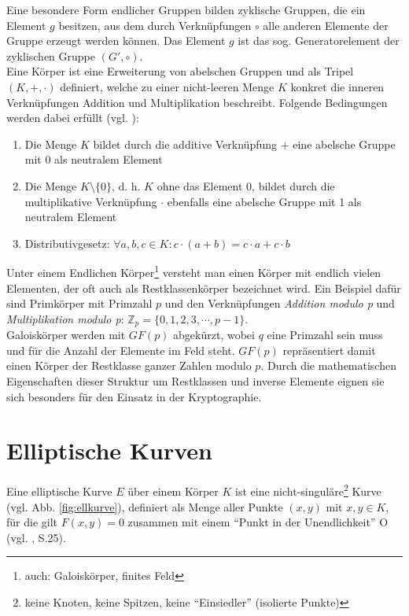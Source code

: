 Eine besondere Form endlicher Gruppen bilden zyklische Gruppen, die ein Element $g$ besitzen, aus dem durch Verknüpfungen $\circ$ alle anderen Elemente der Gruppe erzeugt werden können. Das Element $g$ ist das sog. Generatorelement der zyklischen Gruppe $(G',\circ)$. \\ 

Eine Körper ist eine Erweiterung von abelschen Gruppen und als Tripel $(K,+,\cdot)$ definiert, welche zu einer nicht-leeren Menge $K$ konkret die inneren Verknüpfungen Addition und Multiplikation beschreibt. Folgende Bedingungen werden dabei erfüllt (vgl. \cite{puttmann}):

\begin{enumerate}
  \item Die Menge $K$ bildet durch die additive Verknüpfung $+$ eine abelsche Gruppe
mit 0 als neutralem Element
  \item Die Menge $K\setminus\{0\}$, d. h. $K$ ohne das Element 0, bildet durch die multiplikative Verknüpfung $\cdot$ ebenfalls eine abelsche Gruppe mit 1 als neutralem Element
  \item Distributivgesetz: $ \forall a,b,c \in K: c \cdot (a + b) = c \cdot a + c \cdot b $
\end{enumerate}

Unter einem Endlichen Körper\footnote{auch: Galoiskörper, finites Feld} versteht man einen Körper mit endlich vielen Elementen, der oft auch als Restklassenkörper bezeichnet wird. Ein Beispiel dafür sind Primkörper mit Primzahl $p$ und den Verknüpfungen \textit{Addition modulo p} und \textit{Multiplikation modulo p}: $\mathbb{Z}_p = \{0,1,2,3,\cdots,p-1\}$. \\

Galoiskörper werden mit $GF(p)$ abgekürzt, wobei $q$ eine Primzahl sein muss und für die Anzahl der Elemente im Feld steht. $GF(p)$ repräsentiert damit einen Körper der Restklasse ganzer Zahlen modulo $p$. Durch die mathematischen Eigenschaften dieser Struktur um Restklassen und inverse Elemente eignen sie sich besonders für den Einsatz in der Kryptographie. \\


\section{Elliptische Kurven} \label{sec:ell}

Eine elliptische Kurve $E$ über einem Körper $K$ ist eine nicht-singuläre\footnote{keine Knoten, keine Spitzen, keine ``Einsiedler'' (isolierte Punkte)} Kurve (vgl. Abb. \ref{fig:ellkurve}), definiert als Menge aller Punkte $(x,y)$ mit $x,y \in K$, für die gilt $F(x,y)=0$ zusammen mit einem ``Punkt in der Unendlichkeit'' O (vgl. \cite{grebe}, S.25). \\

